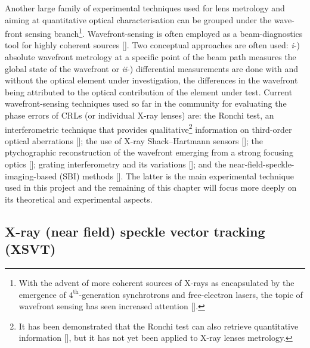 \begin{refsection}
Another large family of experimental techniques used for lens metrology and aiming at quantitative optical characterisation can be grouped under the wave-front sensing branch\footnote{With the advent of more coherent sources of X-rays as encapsulated by the emergence of $4^{\text{th}}$-generation synchrotrons and free-electron lasers, the topic of wavefront sensing has seen increased attention [\cite{Seaberg2019}].}. Wavefront-sensing is often employed as a beam-diagnostics tool for highly coherent sources [\cite{Seaberg2019}]. Two conceptual approaches are often used: \textit{i}-) absolute wavefront metrology at a specific point of the beam path measures the global state of the wavefront or \textit{ii}-) differential measurements are done with and without the optical element under investigation, the differences in the wavefront being attributed to the optical contribution of the element under test. Current wavefront-sensing techniques used so far in the community for evaluating the phase errors of CRLs (or individual X-ray lenses) are: the Ronchi test, an interferometric technique that provides qualitative\footnote{It has been demonstrated that the Ronchi test can also retrieve quantitative information [\cite{Lee2010}], but it has not yet been applied to X-ray lenses metrology.} information on third-order optical aberrations [\cite{Nilsson2012, Uhlen2014}]; the use of X-ray Shack–Hartmann sensors [\cite{Mayo2004, Mercere2005, Mikhaylov2020}]; the ptychographic reconstruction of the wavefront emerging from a strong focusing optics [\cite{Schropp2013,Sala2017,Seiboth2017}]; grating interferometry and its variations [\cite{David2012,Koch2016,Grizolli2017}]; and the near-field-speckle-imaging-based (SBI) methods [\cite{Berujon2013,Zdora2018,Berujon2020a}]. The latter is the main experimental technique used in this project and the remaining of this chapter will focus more deeply on its theoretical and experimental aspects.


\subsection{X-ray (near field) speckle vector tracking (XSVT)}\label{sec:XSVT}%


\end{refsection}
